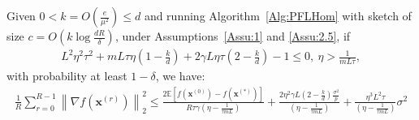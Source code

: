 \begin{theorem}
Given $0<k=O\left(\frac{e}{\mu^2}\right)\leq d$
and running Algorithm~\ref{Alg:PFLHom} with sketch of size $c=O\left(k\log \frac{d R}{\delta}\right)$,  under Assumptions~\ref{Assu:1} and \ref{Assu:2.5}, if 
\begin{align}
       L^2\eta^2\tau^2+mL\tau\eta\left(1-\frac{k}{d}\right)+2\gamma L\eta\tau\left(2-\frac{k}{d}\right)-1\leq 0,\:\eta> \frac{1}{mL\tau},\label{eq:cnd-lrs-h-ii} 
\end{align}
with probability at least $1-\delta$, we have:
\begin{align}
    \frac{1}{R}\sum_{r=0}^{R-1}\left\|\nabla f({\boldsymbol{x}}^{(r)})\right\|_2^2\leq \frac{2 \mathbb{E}\left[f({\boldsymbol{x}}^{(0)})-f({\boldsymbol{x}}^{(*)})\right]}{R\tau \gamma \left({\eta}-\frac{1}{\tau mL}\right)}+\frac{2\eta^2\gamma L\left(2-\frac{k}{d}\right)\frac{\sigma^2}{p}}{ \left({\eta}-\frac{1}{\tau mL}\right)}+\frac{\eta^3L^2\tau}{\left({\eta}-\frac{1}{\tau mL}\right)}\sigma^2 
\end{align}
\end{theorem}
\begin{remark}[$k=d$]
\end{remark}

